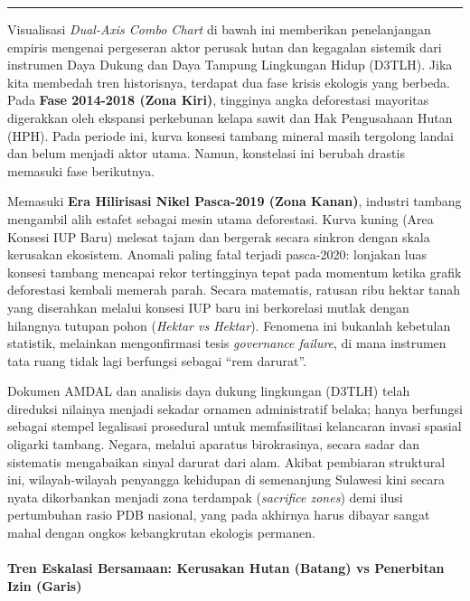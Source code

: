 \documentclass[
]{article}
\begin{document}
\begin{center}\rule{0.5\linewidth}{0.5pt}\end{center}

Visualisasi \emph{Dual-Axis Combo Chart} di bawah ini memberikan
penelanjangan empiris mengenai pergeseran aktor perusak hutan dan
kegagalan sistemik dari instrumen Daya Dukung dan Daya Tampung
Lingkungan Hidup (D3TLH). Jika kita membedah tren historisnya, terdapat
dua fase krisis ekologis yang berbeda. Pada \textbf{Fase 2014-2018 (Zona
Kiri)}, tingginya angka deforestasi mayoritas digerakkan oleh ekspansi
perkebunan kelapa sawit dan Hak Pengusahaan Hutan (HPH). Pada periode
ini, kurva konsesi tambang mineral masih tergolong landai dan belum
menjadi aktor utama. Namun, konstelasi ini berubah drastis memasuki fase
berikutnya.

Memasuki \textbf{Era Hilirisasi Nikel Pasca-2019 (Zona Kanan)}, industri
tambang mengambil alih estafet sebagai mesin utama deforestasi. Kurva
kuning (Area Konsesi IUP Baru) melesat tajam dan bergerak secara sinkron
dengan skala kerusakan ekosistem. Anomali paling fatal terjadi
pasca-2020: lonjakan luas konsesi tambang mencapai rekor tertingginya
tepat pada momentum ketika grafik deforestasi kembali memerah parah.
Secara matematis, ratusan ribu hektar tanah yang diserahkan melalui
konsesi IUP baru ini berkorelasi mutlak dengan hilangnya tutupan pohon
(\emph{Hektar vs Hektar}). Fenomena ini bukanlah kebetulan statistik,
melainkan mengonfirmasi tesis \emph{governance failure}, di mana
instrumen tata ruang tidak lagi berfungsi sebagai ``rem darurat''.

Dokumen AMDAL dan analisis daya dukung lingkungan (D3TLH) telah
direduksi nilainya menjadi sekadar ornamen administratif belaka; hanya
berfungsi sebagai stempel legalisasi prosedural untuk memfasilitasi
kelancaran invasi spasial oligarki tambang. Negara, melalui aparatus
birokrasinya, secara sadar dan sistematis mengabaikan sinyal darurat
dari alam. Akibat pembiaran struktural ini, wilayah-wilayah penyangga
kehidupan di semenanjung Sulawesi kini secara nyata dikorbankan menjadi
zona terdampak (\emph{sacrifice zones}) demi ilusi pertumbuhan rasio PDB
nasional, yang pada akhirnya harus dibayar sangat mahal dengan ongkos
kebangkrutan ekologis permanen.

\paragraph{Tren Eskalasi Bersamaan: Kerusakan Hutan (Batang) vs
Penerbitan Izin
(Garis)}\label{tren-eskalasi-bersamaan-kerusakan-hutan-batang-vs-penerbitan-izin-garis}
\end{document}
